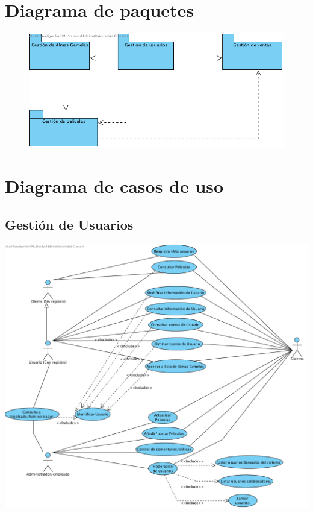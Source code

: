 \documentclass{article}
\begin{document}
\section{Diagrama de paquetes}
	\begin{figure}[h]
		\begin{center}
   			\includegraphics[scale=0.75]{Paquetes.png}
 	  	\end{center}
 	 \end{figure}


\section{Diagrama de casos de uso}
\subsection*{Gestión de Usuarios}
		\begin{center}
   			\includegraphics[scale=0.65]{GestiondeUsuarios.png}
   		\end{center}	
\end{document}
